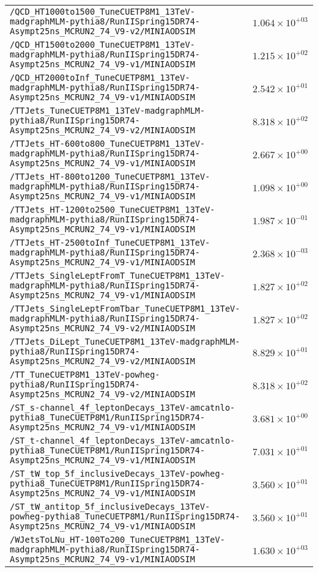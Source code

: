 \begin{center}
\begin{tabular}{ll}
\verb!/QCD_HT1000to1500_TuneCUETP8M1_13TeV-madgraphMLM-pythia8/RunIISpring15DR74-Asympt25ns_MCRUN2_74_V9-v2/MINIAODSIM! &$1.064\times 10^{+03}$\tabularnewline
\verb!/QCD_HT1500to2000_TuneCUETP8M1_13TeV-madgraphMLM-pythia8/RunIISpring15DR74-Asympt25ns_MCRUN2_74_V9-v1/MINIAODSIM! &$1.215\times 10^{+02}$\tabularnewline
\verb!/QCD_HT2000toInf_TuneCUETP8M1_13TeV-madgraphMLM-pythia8/RunIISpring15DR74-Asympt25ns_MCRUN2_74_V9-v1/MINIAODSIM! &$2.542\times 10^{+01}$\tabularnewline
\verb!/TTJets_TuneCUETP8M1_13TeV-madgraphMLM-pythia8/RunIISpring15DR74-Asympt25ns_MCRUN2_74_V9-v2/MINIAODSIM! &$8.318\times 10^{+02}$\tabularnewline
\verb!/TTJets_HT-600to800_TuneCUETP8M1_13TeV-madgraphMLM-pythia8/RunIISpring15DR74-Asympt25ns_MCRUN2_74_V9-v1/MINIAODSIM! &$2.667\times 10^{+00}$\tabularnewline
\verb!/TTJets_HT-800to1200_TuneCUETP8M1_13TeV-madgraphMLM-pythia8/RunIISpring15DR74-Asympt25ns_MCRUN2_74_V9-v1/MINIAODSIM! &$1.098\times 10^{+00}$\tabularnewline
\verb!/TTJets_HT-1200to2500_TuneCUETP8M1_13TeV-madgraphMLM-pythia8/RunIISpring15DR74-Asympt25ns_MCRUN2_74_V9-v1/MINIAODSIM! &$1.987\times 10^{-01}$\tabularnewline
\verb!/TTJets_HT-2500toInf_TuneCUETP8M1_13TeV-madgraphMLM-pythia8/RunIISpring15DR74-Asympt25ns_MCRUN2_74_V9-v1/MINIAODSIM! &$2.368\times 10^{-03}$\tabularnewline
\verb!/TTJets_SingleLeptFromT_TuneCUETP8M1_13TeV-madgraphMLM-pythia8/RunIISpring15DR74-Asympt25ns_MCRUN2_74_V9-v1/MINIAODSIM! &$1.827\times 10^{+02}$\tabularnewline
\verb!/TTJets_SingleLeptFromTbar_TuneCUETP8M1_13TeV-madgraphMLM-pythia8/RunIISpring15DR74-Asympt25ns_MCRUN2_74_V9-v2/MINIAODSIM! &$1.827\times 10^{+02}$\tabularnewline
\verb!/TTJets_DiLept_TuneCUETP8M1_13TeV-madgraphMLM-pythia8/RunIISpring15DR74-Asympt25ns_MCRUN2_74_V9-v2/MINIAODSIM! &$8.829\times 10^{+01}$\tabularnewline
\verb!/TT_TuneCUETP8M1_13TeV-powheg-pythia8/RunIISpring15DR74-Asympt25ns_MCRUN2_74_V9-v2/MINIAODSIM! &$8.318\times 10^{+02}$\tabularnewline
\verb!/ST_s-channel_4f_leptonDecays_13TeV-amcatnlo-pythia8_TuneCUETP8M1/RunIISpring15DR74-Asympt25ns_MCRUN2_74_V9-v1/MINIAODSIM! &$3.681\times 10^{+00}$\tabularnewline
\verb!/ST_t-channel_4f_leptonDecays_13TeV-amcatnlo-pythia8_TuneCUETP8M1/RunIISpring15DR74-Asympt25ns_MCRUN2_74_V9-v1/MINIAODSIM! &$7.031\times 10^{+01}$\tabularnewline
\verb!/ST_tW_top_5f_inclusiveDecays_13TeV-powheg-pythia8_TuneCUETP8M1/RunIISpring15DR74-Asympt25ns_MCRUN2_74_V9-v1/MINIAODSIM! &$3.560\times 10^{+01}$\tabularnewline
\verb!/ST_tW_antitop_5f_inclusiveDecays_13TeV-powheg-pythia8_TuneCUETP8M1/RunIISpring15DR74-Asympt25ns_MCRUN2_74_V9-v1/MINIAODSIM! &$3.560\times 10^{+01}$\tabularnewline
\verb!/WJetsToLNu_HT-100To200_TuneCUETP8M1_13TeV-madgraphMLM-pythia8/RunIISpring15DR74-Asympt25ns_MCRUN2_74_V9-v1/MINIAODSIM! &$1.630\times 10^{+03}$\tabularnewline

\end{tabular}
\end{center}
